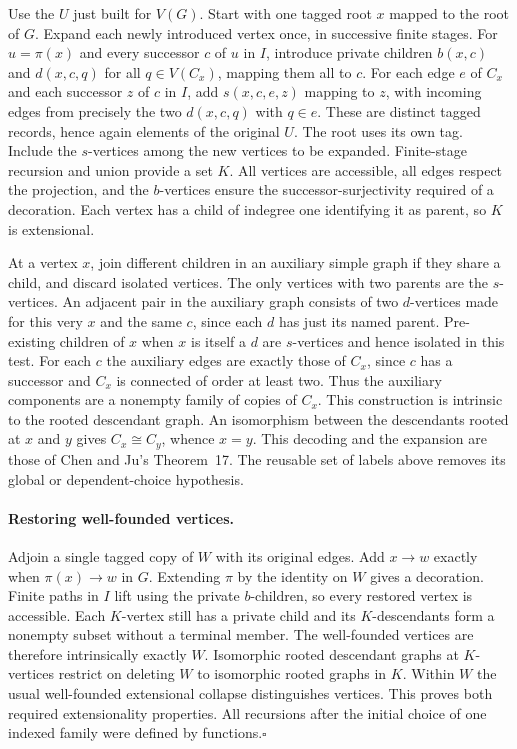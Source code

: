 \documentclass[11pt]{article}
\begin{document}
Use the $U$ just built for $V(G)$. Start with one tagged root $x$ mapped to the root of $G$. Expand each newly introduced vertex once, in successive finite stages. For $u=\pi(x)$ and every successor $c$ of $u$ in $I$, introduce private children $b(x,c)$ and $d(x,c,q)$ for all $q\in V(C_x)$, mapping them all to $c$. For each edge $e$ of $C_x$ and each successor $z$ of $c$ in $I$, add $s(x,c,e,z)$ mapping to $z$, with incoming edges from precisely the two $d(x,c,q)$ with $q\in e$. These are distinct tagged records, hence again elements of the original $U$. The root uses its own tag. Include the $s$-vertices among the new vertices to be expanded. Finite-stage recursion and union provide a set $K$. All vertices are accessible, all edges respect the projection, and the $b$-vertices ensure the successor-surjectivity required of a decoration. Each vertex has a child of indegree one identifying it as parent, so $K$ is extensional.

At a vertex $x$, join different children in an auxiliary simple graph if they share a child, and discard isolated vertices. The only vertices with two parents are the $s$-vertices. An adjacent pair in the auxiliary graph consists of two $d$-vertices made for this very $x$ and the same $c$, since each $d$ has just its named parent. Pre-existing children of $x$ when $x$ is itself a $d$ are $s$-vertices and hence isolated in this test. For each $c$ the auxiliary edges are exactly those of $C_x$, since $c$ has a successor and $C_x$ is connected of order at least two. Thus the auxiliary components are a nonempty family of copies of $C_x$. This construction is intrinsic to the rooted descendant graph. An isomorphism between the descendants rooted at $x$ and $y$ gives $C_x\cong C_y$, whence $x=y$. This decoding and the expansion are those of Chen and Ju's Theorem~17. The reusable set of labels above removes its global or dependent-choice hypothesis.

\paragraph{Restoring well-founded vertices.} Adjoin a single tagged copy of $W$ with its original edges. Add $x\to w$ exactly when $\pi(x)\to w$ in $G$. Extending $\pi$ by the identity on $W$ gives a decoration. Finite paths in $I$ lift using the private $b$-children, so every restored vertex is accessible. Each $K$-vertex still has a private child and its $K$-descendants form a nonempty subset without a terminal member. The well-founded vertices are therefore intrinsically exactly $W$. Isomorphic rooted descendant graphs at $K$-vertices restrict on deleting $W$ to isomorphic rooted graphs in $K$. Within $W$ the usual well-founded extensional collapse distinguishes vertices. This proves both required extensionality properties. All recursions after the initial choice of one indexed family were defined by functions.\hfill$\square$
\end{document}
